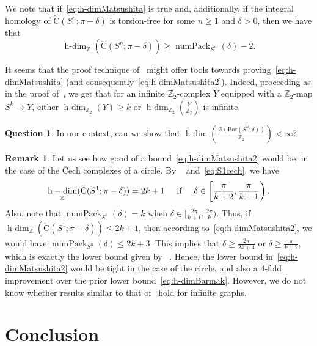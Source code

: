 \documentclass[11 pt,a4paper,twoside,reqno]{amsart}
\theoremstyle{definition}
\newtheorem{remark}[theorem]{Remark}
\newtheorem{question}[theorem]{Question}
\def\Z{{\mathbb Z}}
\def\cB{{\mathcal B}}
\newcommand{\cech}[2]{\mathrm{\check{C}}(#1;#2)}
\DeclareMathOperator{\numpack}{numPack}
\newcommand{\bor}[2]{\mathrm{Bor}(#1;#2)}
\DeclareMathOperator{\hdim}{h-dim}
\begin{document}
We note that if~\eqref{eq:h-dimMatsushita} is true and, additionally, if the integral homology of $\cech{S^n}{\pi-\delta}$ is torsion-free for some $n\ge 1$ and $\delta>0$, then we have that
\begin{equation}
\label{eq:h-dimMatsushita2}
\hdim_{\Z}(\cech{S^n}{\pi-\delta}) \ge \numpack_{S^n}(\delta)-2.
\end{equation}

It seems that the proof technique of~\cite[Lemma~7]{matsushita2023dominance} might offer tools towards proving~\eqref{eq:h-dimMatsushita} (and consequently~\eqref{eq:h-dimMatsushita2}).
Indeed, proceeding as in the proof of~\cite[Lemma~7]{matsushita2023dominance}, we get that for an infinite $\Z_2$-complex $Y$ equipped with a $\Z_2$-map $S^k \to Y$, either $\hdim_{\Z_2}(Y) \ge k$ or $\hdim_{\Z_2}(\tfrac{Y}{\Z_2})$ is infinite.

\begin{question}
In our context, can we show that $\hdim\left(\frac{\cB(\bor{S^n}{\delta})}{\Z_2}\right)<\infty$?
\end{question}

\begin{remark}
Let us see how good of a bound~\eqref{eq:h-dimMatsushita2} would be, in the case of the \v{C}ech complexes of a circle.
By ~\cite[Theorem 9.8]{AA-VRS1} and~\eqref{eq:S1cech}, we have
\[
\hdim_{\Z}(\cech{S^1}{\pi-\delta}) = 2k+1 \hspace{5mm} \text{if} \hspace{5mm} \delta \in \left[\frac{\pi}{k+2},\frac{\pi}{k+1}\right).
\]
Also, note that $\numpack_{S^1}(\delta) = k$ when $\delta \in [\tfrac{2\pi}{k+1}, \tfrac{2\pi}{k} )$.
Thus, if $\hdim_{\Z}(\cech{S^1}{\pi-\delta}) \leq 2k+1$, then according to~\eqref{eq:h-dimMatsushita2}, we would have $\numpack_{S^n}(\delta) \leq 2k +3$.
This implies that $\delta \ge \frac{2\pi}{2k +4}$ or $\delta \ge \frac{\pi}{k +2}$, which is exactly the lower bound given by ~\cite[Theorem 9.8]{AA-VRS1}.
Hence, the lower bound in~\eqref{eq:h-dimMatsushita2} would be tight in the case of the circle, and also a $4$-fold improvement over the prior lower bound~\eqref{eq:h-dimBarmak}.
However, we do not know whether results similar to that of~\cite[Lemma~4.3]{MatsushitaWakatsuki} hold for infinite graphs.
\end{remark}





\section{Conclusion}
\label{sec:conclusion}
\end{document}
